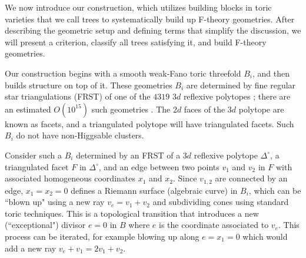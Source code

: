 \documentclass[aps,prl,twocolumn, superscriptaddress,groupedaddress,nofootinbib]{revtex4-1}
\begin{document}
\vspace{.2cm}

We now introduce our construction, which utilizes building blocks in toric
varieties that we call trees to systematically build up F-theory geometries.
After describing the geometric setup and defining terms that simplify the
discussion, we will present a criterion, classify all trees satisfying it, and
build F-theory geometries.


Our construction begins with a smooth weak-Fano toric threefold $B_i$, and
then builds structure on top of it. These geometries $B_i$ are  determined by
fine regular star triangulations (FRST) of one of the $4319$  $3d$ reflexive
polytopes \cite{Kreuzer:1998vb}; there are an estimated
 $O(10^{15})$ such geometries \cite{Halverson:2016tve}. The $2d$
faces of the $3d$ polytope are known as facets, and a triangulated polytope
will have triangulated facets.  Such $B_i$ do not have non-Higgsable clusters.

Consider such a $B_i$ determined by an FRST of a $3d$ reflexive polytope
$\Delta^\circ$, a triangulated facet $F$ in $\Delta^\circ$, and an edge
between two points $v_1$ and $v_2$ in $F$ with
associated homogeneous coordinates $x_1$ and $x_2$. Since $v_{1,2}$ are connected
by an edge, $x_1=x_2=0$ defines a Riemann surface (algebraic curve)
in $B_i$, which can be ``blown up" using a new ray $v_e=v_1+v_2$ and subdividing
cones using standard toric techniques. This is a topological transition that introduces
a new (``exceptional") divisor $e=0$ in $B$ where $e$ is the coordinate associated to $v_e$.
This
process can be iterated, for example blowing up along $e=x_1=0$ which would
add a new ray $v_e+v_1=2v_1+v_2$.
\end{document}
